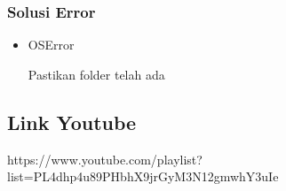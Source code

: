 \subsubsection{Solusi Error}
\hfill\break
\begin{itemize}
\item OSError

Pastikan folder telah ada
\end{itemize}

\subsection{Link Youtube}
https://www.youtube.com/playlist?list=PL4dhp4u89PHbhX9jrGyM3N12gmwhY3uIe